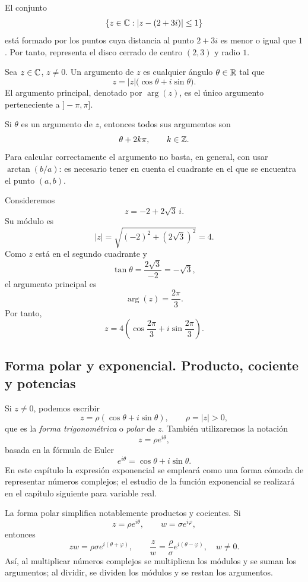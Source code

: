 \begin{example}
El conjunto
\[
\{z\in\mathbb{C}:|z-(2+3i)|\leq1\}
\]
está formado por los puntos cuya distancia al punto \(2+3i\) es menor o igual que \(1\). Por tanto, representa el disco cerrado de centro \((2,3)\) y radio \(1\).
\end{example}

\begin{definition}[Argumento]
Sea \(z\in\mathbb{C}\), \(z\neq0\). Un argumento de \(z\) es cualquier ángulo \(\theta\in\mathbb{R}\) tal que
\[
z=|z|\bigl(\cos\theta+i\sin\theta\bigr).
\]
El argumento principal, denotado por \(\arg(z)\), es el único argumento perteneciente a \(]-\pi,\pi]\).
\end{definition}

Si \(\theta\) es un argumento de \(z\), entonces todos sus argumentos son
\[
\theta+2k\pi,\qquad k\in\mathbb{Z}.
\]
Para calcular correctamente el argumento no basta, en general, con usar \(\arctan(b/a)\): es necesario tener en cuenta el cuadrante en el que se encuentra el punto \((a,b)\).

\begin{example}
Consideremos
\[
z=-2+2\sqrt3\,i.
\]
Su módulo es
\[
|z|=\sqrt{(-2)^2+(2\sqrt3)^2}=4.
\]
Como \(z\) está en el segundo cuadrante y
\[
\tan\theta=\frac{2\sqrt3}{-2}=-\sqrt3,
\]
el argumento principal es
\[
\arg(z)=\frac{2\pi}{3}.
\]
Por tanto,
\[
z=4\left(\cos\frac{2\pi}{3}+i\sin\frac{2\pi}{3}\right).
\]
\end{example}

\subsection{Forma polar y exponencial. Producto, cociente y potencias}

Si \(z\neq0\), podemos escribir
\[
z=\rho(\cos\theta+i\sin\theta),
\qquad \rho=|z|>0,
\]
que es la \emph{forma trigonométrica} o \emph{polar} de \(z\). También utilizaremos la notación
\[
z=\rho e^{i\theta},
\]
basada en la fórmula de Euler
\[
e^{i\theta}=\cos\theta+i\sin\theta.
\]
En este capítulo la expresión exponencial se empleará como una forma cómoda de representar números complejos; el estudio de la función exponencial se realizará en el capítulo siguiente para variable real.

La forma polar simplifica notablemente productos y cocientes. Si
\[
z=\rho e^{i\theta},
\qquad
w=\sigma e^{i\varphi},
\]
entonces
\[
zw=\rho\sigma e^{i(\theta+\varphi)},
\qquad
\frac zw=\frac{\rho}{\sigma}e^{i(\theta-\varphi)},\quad w\neq0.
\]
Así, al multiplicar números complejos se multiplican los módulos y se suman los argumentos; al dividir, se dividen los módulos y se restan los argumentos.

